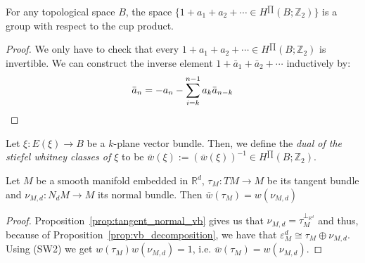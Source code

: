 \begin{lemma} For any topological space $B$, the space $\big\{1+a_1+a_2+\cdots\in H^{\prod}(B;\mathbb{Z}_2)\big\}$ is a group with respect to the cup product.
\end{lemma}
\begin{proof} We only have to check that every $1+a_1+a_2+\cdots\in H^{\prod}(B;\mathbb{Z}_2)$ is invertible. We can construct the inverse element $1+\bar{a}_1+\bar{a}_2+\cdots$ inductively by:
\[\bar{a}_n=-a_n-\sum_{i=k}^{n-1}a_k\bar{a}_{n-k}\qedhere\]
\end{proof}

\begin{definition} Let $\xi:E(\xi)\to B$ be a $k$-plane vector bundle. Then, we define the \emph{dual of the stiefel whitney classes of $\xi$} to be $\bar{w}(\xi):=(\bar{w}(\xi))^{-1}\in H^{\prod}(B;\mathbb{Z}_2)$.
\end{definition}

\begin{proposition} Let $M$ be a smooth manifold embedded in $\mathbb{R}^d$, $\tau_M:TM\to M$ be its tangent bundle and $\nu_{M,d}:N_dM\to M$ its normal bundle. Then $\bar{w}(\tau_M)=w(\nu_{M,d})$
\end{proposition}
\begin{proof} Proposition~\ref{prop:tangent_normal_vb} gives us that $\nu_{M,d}=\tau_M^{\perp_{\mathbb{R}^d}}$ and thus, because of Proposition~\ref{prop:vb_decomposition}, we have that $\varepsilon_M^d\cong\tau_M\oplus\nu_{M,d}$. Using (SW2) we get $w(\tau_M)w(\nu_{M,d})=1$, i.e. $\bar{w}(\tau_M)=w(\nu_{M,d})$.
\end{proof}

